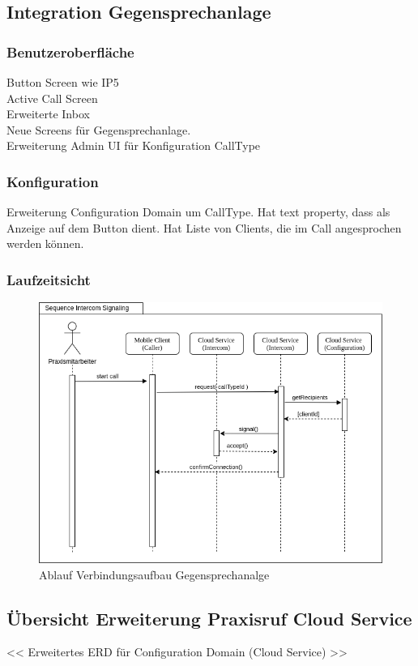 \clearpage

\subsection{Integration Gegensprechanlage}

\subsubsection*{Benutzeroberfläche}

Button Screen wie IP5 \\
Active Call Screen \\
Erweiterte Inbox \\
Neue Screens für Gegensprechanlage. \\
Erweiterung Admin UI für Konfiguration CallType \\


\subsubsection*{Konfiguration}
Erweiterung Configuration Domain um CallType.
Hat text property, dass als Anzeige auf dem Button dient.
Hat Liste von Clients, die im Call angesprochen werden können.

\subsubsection*{Laufzeitsicht}

\begin{figure}[h]
    \centering
    \begin{minipage}[b]{0.9\textwidth}
        \includegraphics[width=\textwidth]{graphics/diagramms/Sequence_Intercom_Broking_V01}
        \caption{Ablauf Verbindungsaufbau Gegensprechanalge}
    \end{minipage}
\end{figure}

\clearpage

\subsection{Übersicht Erweiterung Praxisruf Cloud Service}

<< Erweitertes ERD für Configuration Domain (Cloud Service) >>

\clearpage
